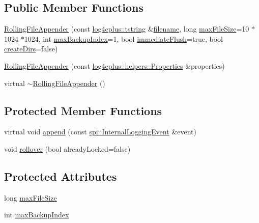 \subsection*{Public Member Functions}
\begin{DoxyCompactItemize}
\item 
\hyperlink{classlog4cplus_1_1RollingFileAppender_aa3f47fb76ae5ae3f2ac6ef576ba8fe3f}{Rolling\-File\-Appender} (const \hyperlink{namespacelog4cplus_a3c9287f6ebcddc50355e29d71152117b}{log4cplus\-::tstring} \&\hyperlink{classlog4cplus_1_1FileAppender_aa04b4a30301c69d784248eccbac2f864}{filename}, long \hyperlink{classlog4cplus_1_1RollingFileAppender_aa60097480e57fa947795b5c3278fe573}{max\-File\-Size}=10 $\ast$1024 $\ast$1024, int \hyperlink{classlog4cplus_1_1RollingFileAppender_a4a19bc9843438a939fbd40869cad5c69}{max\-Backup\-Index}=1, bool \hyperlink{classlog4cplus_1_1FileAppender_a89f7c6ae8f630cc2190a376fcc7ca2cc}{immediate\-Flush}=true, bool \hyperlink{classlog4cplus_1_1FileAppender_aa9b466ab8de95868505db1b05c645e3f}{create\-Dirs}=false)
\item 
\hyperlink{classlog4cplus_1_1RollingFileAppender_a6b71c8947f6398c601395f0178aa7536}{Rolling\-File\-Appender} (const \hyperlink{classlog4cplus_1_1helpers_1_1Properties}{log4cplus\-::helpers\-::\-Properties} \&properties)
\item 
virtual \hyperlink{classlog4cplus_1_1RollingFileAppender_adf0c824ee29455a635b3a73de4fca693}{$\sim$\-Rolling\-File\-Appender} ()
\end{DoxyCompactItemize}
\subsection*{Protected Member Functions}
\begin{DoxyCompactItemize}
\item 
virtual void \hyperlink{classlog4cplus_1_1RollingFileAppender_adc10fea61bae7d6e491639ffb77a1cc3}{append} (const \hyperlink{classlog4cplus_1_1spi_1_1InternalLoggingEvent}{spi\-::\-Internal\-Logging\-Event} \&event)
\item 
void \hyperlink{classlog4cplus_1_1RollingFileAppender_a7d98e6bd4af10f11b72b3b813dc4b714}{rollover} (bool already\-Locked=false)
\end{DoxyCompactItemize}
\subsection*{Protected Attributes}
\begin{DoxyCompactItemize}
\item 
long \hyperlink{classlog4cplus_1_1RollingFileAppender_aa60097480e57fa947795b5c3278fe573}{max\-File\-Size}
\item 
int \hyperlink{classlog4cplus_1_1RollingFileAppender_a4a19bc9843438a939fbd40869cad5c69}{max\-Backup\-Index}
\end{DoxyCompactItemize}
